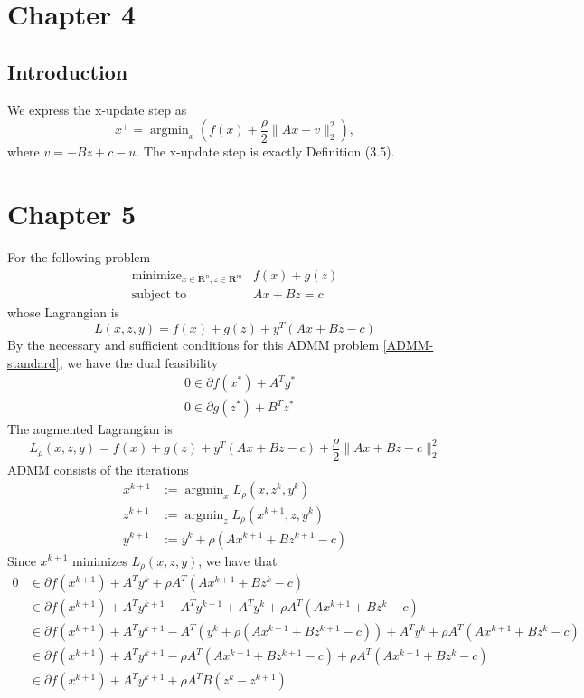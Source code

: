 \documentclass{article}
\theoremstyle{remark}
\newcommand{\argmin}{\mathop{\mathrm{argmin}}}
\newcommand{\st}{\mathop{\mathrm{subject\,\,to}}}
\def\R{\mathbf{R}}
\begin{document}
\section{Chapter 4}
\subsection{Introduction}
We express the x-update step as
\[
x^+=\argmin_x (f(x)+\frac{\rho}{2}\|Ax-v\|_2^2),
\]
where $v=-Bz+c-u$. The x-update step is exactly Definition (3.5).

\section{Chapter 5}
For the following problem
\begin{equation}\label{ADMM-standard}
\begin{array}{ll}
\operatorname{minimize}_{x\in\R^n,z\in\R^m}& f(x) + g(z)\\
\st & Ax+Bz=c
\end{array}
\end{equation}
whose Lagrangian is
\begin{equation}\label{ADMM-Lagrangian}
L(x,z,y)=f(x) + g(z) + y^T(Ax+Bz-c)
\end{equation}
By the necessary and sufficient conditions for this ADMM problem \eqref{ADMM-standard}, we have the dual feasibility
\begin{align}
&0\in \partial f(x^*) + A^Ty^* \label{dual-feasibility-f-x} \\
&0\in \partial g(z^*) + B^Tz^* \label{dual-feasibility-g-z}
\end{align}
The augmented Lagrangian is
\begin{equation}\label{ADMM-augmented-Lagrangian}
L_{\rho}(x,z,y)=f(x) + g(z) + y^T(Ax+Bz-c) + \frac{\rho}{2}\|Ax+Bz-c\|_2^2
\end{equation}
ADMM consists of the iterations
\begin{align*}
  x^{k+1} &:=\argmin_x L_{\rho}(x,z^k,y^k) \\
  z^{k+1} &:=\argmin_z L_{\rho}(x^{k+1},z,y^k) \\
  y^{k+1} &:=y^k+\rho(Ax^{k+1}+Bz^{k+1}-c)
\end{align*}
Since $x^{k+1}$ minimizes $L_{\rho}(x,z,y)$, we have that
\begin{align*}
  0 &\in\partial f(x^{k+1}) + A^Ty^k + \rho A^T(Ax^{k+1}+Bz^k-c) \\
   &\in\partial f(x^{k+1})+ A^Ty^{k+1}-A^Ty^{k+1} + A^Ty^k + \rho A^T(Ax^{k+1}+Bz^k-c) \\
  & \in\partial f(x^{k+1})+ A^Ty^{k+1}-A^T(y^k+\rho (Ax^{k+1}+Bz^{k+1}-c)) + A^Ty^k + \rho A^T(Ax^{k+1}+Bz^k-c) \\
  & \in\partial f(x^{k+1})+ A^Ty^{k+1}-\rho A^T(Ax^{k+1}+Bz^{k+1}-c) + \rho A^T(Ax^{k+1}+Bz^k-c) \\
  & \in\partial f(x^{k+1})+ A^Ty^{k+1}+\rho A^TB(z^k-z^{k+1})\\
\end{align*}
\end{document}

